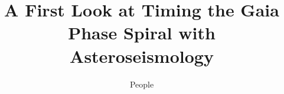 


\documentclass[modern]{aastex63}

\usepackage{microtype}  %
\usepackage{amsmath}
\usepackage{amsfonts}
\usepackage{amssymb}
\usepackage{booktabs}
\usepackage{graphicx}

\usepackage{enumitem}

\renewcommand{\twocolumngrid}{\onecolumngrid} %
\setlength{\parindent}{1.1\baselineskip}
\addtolength{\topmargin}{-0.2in}
\addtolength{\textheight}{0.4in}
\sloppy\sloppypar\raggedbottom\frenchspacing

\newcommand{\changes}[1]{{\color{violet}#1}}


\graphicspath{{figures/}}


\shorttitle{}



\title{A First Look at Timing the Gaia Phase Spiral with Asteroseismology}

\author{People}



\begin{abstract}\noindent
TODO
\end{abstract}


\section*{~}\clearpage
